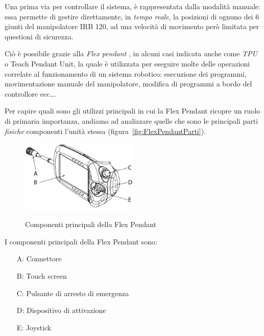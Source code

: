 Una prima via per controllare il sistema, è rappresentata dalla modalità manuale:
essa permette di gestire direttamente, in \emph{tempo reale}, la posizioni di ognuno dei 6 giunti del manipolatore IRB 120, ad una velocità di movimento però limitata per questioni di sicurezza.

Ciò è possibile grazie alla \emph{Flex pendant} \label{text:FlexPendant}, in alcuni casi indicata anche come \emph{TPU} o Teach Pendant Unit, la quale è utilizzata per eseguire molte delle operazioni correlate al funzionamento di un sistema robotico: esecuzione dei programmi, movimentazione manuale del manipolatore, modifica di programmi a bordo del controllore ecc\dots\cite{ABB:Web_FlexPendant}.

Per capire quali sono gli utilizzi principali in cui la Flex Pendant ricopre un ruolo di primaria importanza, andiamo ad analizzare quelle che sono le principali parti \emph{fisiche} componenti l'unità stessa (figura~\vref{fig:FlexPendantParti}).
\begin{figure}[h]
	\centering
	\includegraphics[width=0.5\textwidth]{Immagini/MainPart_TeachPendant}
	\caption{Componenti principali della Flex Pendant}{\cite{ABB:Web_FlexPendant}}
	\label{fig:FlexPendantParti}
\end{figure}

I componenti principali della Flex Pendant sono:
\begin{itemize}
	\item[A: ] Connettore
	\item[B: ] Touch screen
	\item[C: ] Pulsante di arresto di emergenza
	\item[D: ] Dispositivo di attivazione
	\item[E: ] Joystick
\end{itemize}

